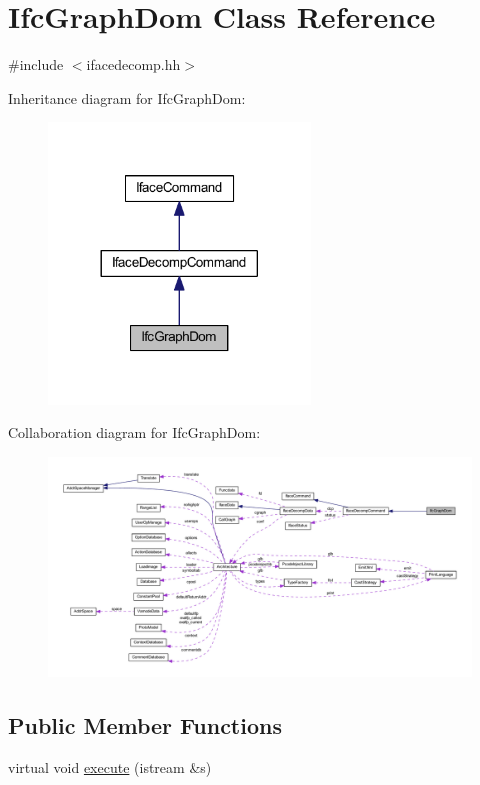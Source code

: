 \hypertarget{class_ifc_graph_dom}{}\section{Ifc\+Graph\+Dom Class Reference}
\label{class_ifc_graph_dom}


{\ttfamily \#include $<$ifacedecomp.\+hh$>$}



Inheritance diagram for Ifc\+Graph\+Dom\+:
\nopagebreak
\begin{figure}[H]
\begin{center}
\leavevmode
\includegraphics[width=197pt]{class_ifc_graph_dom__inherit__graph}
\end{center}
\end{figure}


Collaboration diagram for Ifc\+Graph\+Dom\+:
\nopagebreak
\begin{figure}[H]
\begin{center}
\leavevmode
\includegraphics[width=350pt]{class_ifc_graph_dom__coll__graph}
\end{center}
\end{figure}
\subsection*{Public Member Functions}
\begin{DoxyCompactItemize}
\item 
virtual void \mbox{\hyperlink{class_ifc_graph_dom_aa784fb7316319c32eeee3e2b10c58b86}{execute}} (istream \&s)
\end{DoxyCompactItemize}
